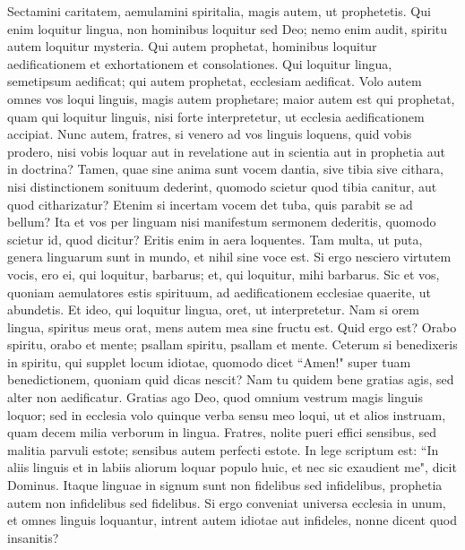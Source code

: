 \begin{biblechapter} 
\verse Sectamini caritatem, aemulamini spiritalia, magis autem, ut prophetetis. 
\verse Qui enim loquitur lingua, non hominibus loquitur sed Deo; nemo enim audit, spiritu autem loquitur mysteria. 
\verse Qui autem prophetat, hominibus loquitur aedificationem et exhortationem et consolationes. 
\verse Qui loquitur lingua, semetipsum aedificat; qui autem prophetat, ecclesiam aedificat. 
\verse Volo autem omnes vos loqui linguis, magis autem prophetare; maior autem est qui prophetat, quam qui loquitur linguis, nisi forte interpretetur, ut ecclesia aedificationem accipiat. 
\verse Nunc autem, fratres, si venero ad vos linguis loquens, quid vobis prodero, nisi vobis loquar aut in revelatione aut in scientia aut in prophetia aut in doctrina? 
\verse Tamen, quae sine anima sunt vocem dantia, sive tibia sive cithara, nisi distinctionem sonituum dederint, quomodo scietur quod tibia canitur, aut quod citharizatur? 
\verse Etenim si incertam vocem det tuba, quis parabit se ad bellum? 
\verse Ita et vos per linguam nisi manifestum sermonem dederitis, quomodo scietur id, quod dicitur? Eritis enim in aera loquentes.  
\verse Tam multa, ut puta, genera linguarum sunt in mundo, et nihil sine voce est.  
\verse Si ergo nesciero virtutem vocis, ero ei, qui loquitur, barbarus; et, qui loquitur, mihi barbarus. 
\verse Sic et vos, quoniam aemulatores estis spirituum, ad aedificationem ecclesiae quaerite, ut abundetis. 
\verse Et ideo, qui loquitur lingua, oret, ut interpretetur. 
\verse Nam si orem lingua, spiritus meus orat, mens autem mea sine fructu est.  
\verse Quid ergo est? Orabo spiritu, orabo et mente; psallam spiritu, psallam et mente. 
\verse Ceterum si benedixeris in spiritu, qui supplet locum idiotae, quomodo dicet “Amen!" super tuam benedictionem, quoniam quid dicas nescit? 
\verse Nam tu quidem bene gratias agis, sed alter non aedificatur. 
\verse Gratias ago Deo, quod omnium vestrum magis linguis loquor; 
\verse sed in ecclesia volo quinque verba sensu meo loqui, ut et alios instruam, quam decem milia verborum in lingua. 
\verse Fratres, nolite pueri effici sensibus, sed malitia parvuli estote; sensibus autem perfecti estote. 
\verse In lege scriptum est: “In aliis linguis et in labiis aliorum loquar populo huic, et nec sic exaudient me", dicit Dominus. 
\verse Itaque linguae in signum sunt non fidelibus sed infidelibus, prophetia autem non infidelibus sed fidelibus. 
\verse Si ergo conveniat universa ecclesia in unum, et omnes linguis loquantur, intrent autem idiotae aut infideles, nonne dicent quod insanitis? 

\end{biblechapter}
